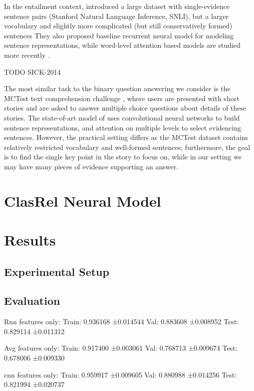 \documentclass[11pt]{article}
\begin{document}
In the entailment context, \cite{SNLI} introduced a large dataset
with single-evidence sentence pairs (Stanford Natural Language Inference, SNLI),
but a larger vocabulary and
slightly more complicated (but still conservatively formed) sentences
They also proposed baseline recurrent neural model for modeling
sentence representations, while word-level attention based models
are studied more recently \cite{SNLIattn} \cite{LSTMMR}.

TODO SICK-2014

The most similar task to the binary question answering we consider
is the MCTest text comprehension challenge \cite{MCTest}, where
users are presented with short stories and are asked to answer multiple
choice questions about details of these stories.  The state-of-art model
of \cite{HABCNN} uses convolutional neural networks to build sentence
representations, and attention on multiple levels to select evidencing
sentences.
However, the practical setting differs as the MCTest dataset contains
relatively restricted vocabulary and well-formed sentences; furthermore,
the goal is to find the single key point in the story to focus on, while
in our setting we may have many pieces of evidence supporting an answer.

\section{ClasRel Neural Model}
\label{sec:clasrel}

\section{Results}
\label{sec:res}

\subsection{Experimental Setup}

\subsection{Evaluation}

Rnn features only:
Train: 0.936168 ±0.014544
Val: 0.883608 ±0.008952
Test: 0.829114 ±0.011312

Avg features only:
Train: 0.917400 ±0.003061
Val: 0.768713 ±0.009674
Test: 0.678006 ±0.009330

cnn features only:
Train: 0.959917 ±0.009605
Val: 0.880988 ±0.014256
Test: 0.821994 ±0.020737
\end{document}
